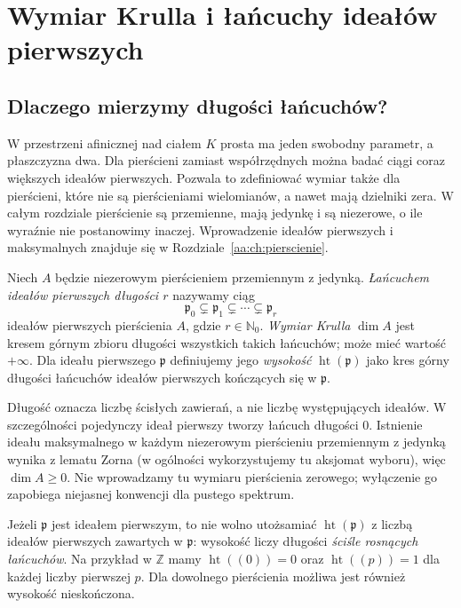 \chapter{Wymiar Krulla i łańcuchy ideałów pierwszych}
\label{aa:ch:krull-dimension}

\providecommand{\atlasref}[2]{#2}

\section{Dlaczego mierzymy długości łańcuchów?}
W przestrzeni afinicznej nad ciałem $K$ prosta ma jeden swobodny
parametr, a płaszczyzna dwa. Dla pierścieni zamiast współrzędnych
można badać ciągi coraz większych ideałów pierwszych. Pozwala to
zdefiniować wymiar także dla pierścieni, które nie są pierścieniami
wielomianów, a nawet mają dzielniki zera. W całym rozdziale pierścienie
są przemienne, mają jedynkę i są niezerowe, o ile wyraźnie nie
postanowimy inaczej. Wprowadzenie ideałów pierwszych i maksymalnych
znajduje się w Rozdziale~\ref{aa:ch:pierscienie}.

\begin{definicja}\label{aa:def:krull-dimension}
Niech $A$ będzie niezerowym pierścieniem przemiennym z jedynką.
\emph{Łańcuchem ideałów pierwszych długości $r$} nazywamy ciąg
\[
 \mathfrak p_0\subsetneq\mathfrak p_1\subsetneq\cdots
 \subsetneq\mathfrak p_r
\]
ideałów pierwszych pierścienia $A$, gdzie $r\in\mathbb N_0$.
\emph{Wymiar Krulla} $\dim A$ jest kresem górnym zbioru długości
wszystkich takich łańcuchów; może mieć wartość $+\infty$.
Dla ideału pierwszego $\mathfrak p$ definiujemy jego \emph{wysokość}
$\operatorname{ht}(\mathfrak p)$ jako kres górny długości łańcuchów
ideałów pierwszych kończących się w $\mathfrak p$.
\end{definicja}

Długość oznacza liczbę ścisłych zawierań, a nie liczbę występujących
ideałów. W szczególności pojedynczy ideał pierwszy tworzy łańcuch
długości $0$. Istnienie ideału maksymalnego w każdym niezerowym
pierścieniu przemiennym z jedynką wynika z lematu Zorna (w ogólności
wykorzystujemy tu aksjomat wyboru), więc $\dim A\ge0$.
Nie wprowadzamy tu wymiaru pierścienia zerowego; wyłączenie go
zapobiega niejasnej konwencji dla pustego spektrum.

Jeżeli $\mathfrak p$ jest ideałem pierwszym, to nie wolno
utożsamiać $\operatorname{ht}(\mathfrak p)$ z liczbą
ideałów pierwszych zawartych w $\mathfrak p$:
wysokość liczy długości \emph{ściśle rosnących łańcuchów}.
Na przykład w $\mathbb Z$ mamy
$\operatorname{ht}((0))=0$ oraz
$\operatorname{ht}((p))=1$ dla każdej liczby pierwszej $p$.
Dla dowolnego pierścienia możliwa jest również wysokość nieskończona.



